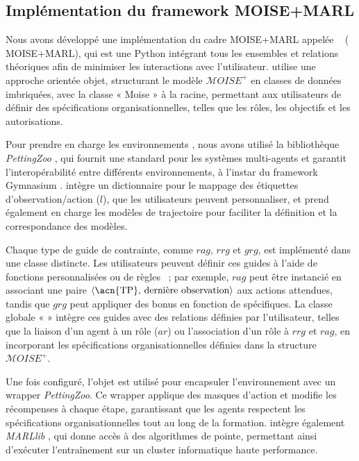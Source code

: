 \subsection{Implémentation du framework MOISE+MARL}

Nous avons développé une implémentation du cadre MOISE+MARL appelée ~\hyperref[fn:github]{\footnotemark[2]} ( MOISE+MARL), qui est une  Python intégrant tous les ensembles et relations théoriques afin de minimiser les interactions avec l'utilisateur.  utilise une approche orientée objet, structurant le modèle $\mathcal{M}OISE^+$ en classes de données imbriquées, avec la classe « Moise » à la racine, permettant aux utilisateurs de définir des spécifications organisationnelles, telles que les rôles, les objectifs et les autorisations.


Pour prendre en charge les environnements , nous avons utilisé la bibliothèque \textit{PettingZoo} \cite{terry2020pettingzoo}, qui fournit une  standard pour les systèmes multi-agents et garantit l'interopérabilité entre différents environnements, à l'instar du framework Gymnasium \cite{kwiatkowski2024}.  intègre un dictionnaire pour le mappage des étiquettes d'observation/action ($l$), que les utilisateurs peuvent personnaliser, et prend également en charge les modèles de trajectoire  pour faciliter la définition et la correspondance des modèles.

Chaque type de guide de contrainte, comme $rag$, $rrg$ et $grg$, est implémenté dans une classe distincte. Les utilisateurs peuvent définir ces guides à l'aide de fonctions personnalisées ou de règles ~; par exemple, $rag$ peut être instancié en associant une paire $\langle \text{\acn{TP}, dernière observation} \rangle$ aux actions attendues, tandis que $grg$ peut appliquer des bonus en fonction de  spécifiques. La classe globale «  » intègre ces guides avec des relations définies par l'utilisateur, telles que la liaison d'un agent à un rôle ($ar$) ou l'association d'un rôle à $rrg$ et $rag$, en incorporant les spécifications organisationnelles définies dans la structure $\mathcal{M}OISE^+$.

Une fois configuré, l'objet  est utilisé pour encapsuler l'environnement avec un wrapper \textit{PettingZoo}. Ce wrapper applique des masques d'action et modifie les récompenses à chaque étape, garantissant que les agents respectent les spécifications organisationnelles tout au long de la formation.  intègre également \textit{MARLlib} \cite{hu2021marlib}, qui donne accès à des algorithmes  de pointe, permettant ainsi d'exécuter l'entraînement sur un cluster informatique haute performance.

